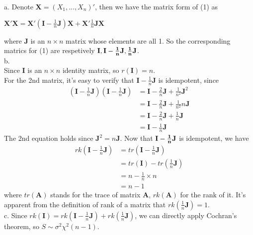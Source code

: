 \documentclass[12pt]{article}
\begin{document}
{
a. Denote $\textbf{X} =(X_1,...,X_n)'$, then we have the matrix form of (1) as
\begin{center} 
$\textbf{X}'\textbf{X}=\textbf{X}'(\textbf{I}-\frac{1}{n}\textbf{J})\textbf{X}+\textbf{X}'\frac{1}{n}\textbf{J}\textbf{X}$
\end{center}
where $\textbf{J}$ is an $n \times n$ matrix whose elements are all 1. 
So the corresponding matrics for (1) are respetively $\textbf{I},\bf{I}-\frac{1}{n}\textbf{J},\frac{1}{n}\textbf{J}$.\\
b. \\
Since $\textbf{I}$ is an $n \times n$ identity matrix, so $r(\textbf{I})=n$.\\
For the 2nd matrix, it's easy to verify that $\textbf{I}-\frac{1}{n}\textbf{J}$ is idempotent, since
\begin{align*}
(\textbf{I}-\frac{1}{n}\textbf{J})(\textbf{I}-\frac{1}{n}\textbf{J})&=\textbf{I}-\frac{2}{n}\textbf{J}+\frac{1}{n^2}\textbf{J}^2\\
                                                                       &=\textbf{I}-\frac{2}{n}\textbf{J}+\frac{1}{n^2}n\textbf{J}\\
                                                                       &=\textbf{I}-\frac{2}{n}\textbf{J}+\frac{1}{n}\textbf{J}\\
                                                                       &=\textbf{I}-\frac{1}{n}\textbf{J}
\end{align*}
The 2nd equation holds since $\textbf{J}^2=n\textbf{J}$. Now that $\bf{I}-\frac{1}{n}\bf{J}$ is idempotent, we have
\begin{align*}
rk(\textbf{I}-\frac{1}{n}\textbf{J})&=tr(\textbf{I}-\frac{1}{n}\textbf{J})\\
                                                  &=tr(\textbf{I})-tr(\frac{1}{n}\textbf{J})\\
                                                  &=n-\frac{1}{n}\times n\\
                                                  &=n-1
\end{align*}
where $tr(\textbf{A})$ stands for the trace of matrix $\textbf{A}$, $rk(\textbf{A})$ for the rank of it. It's apparent from the definition of rank of a matrix that $rk(\frac{1}{n}\textbf{J})=1$.\\
c. Since $rk(\textbf{I})=rk(\textbf{I}-\frac{1}{n}\textbf{J})+rk(\frac{1}{n}\textbf{J})$, we can directly apply Cochran's theorem, so $S\sim \sigma^2 \chi^2(n-1)$.




}
\end{document}
